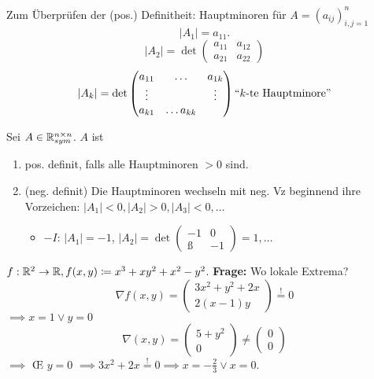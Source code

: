 Zum Überprüfen der (pos.) Definitheit: Hauptminoren für $ A = (a_{ij} )_{i,j = 1}^n  $ 
\[
	\left| A_1 \right| = a_{11}.
\]
\[
	\left| A_2 \right| = \det \begin{pmatrix} a_{11} & a_{12} \\ a_{21} & a_{22} \end{pmatrix} 
\]
\[
	\left| A_k \right| = \det \begin{pmatrix} a_{11} & \hdots & a_{1k} \\ \vdots & & \vdots \\ a_{k1} & \hdots a_{kk}  \end{pmatrix} \text{``$ k $-te Hauptminore''} 
\]

\begin{theorem}[Hirwitz]
	Sei $ A \in \mathbb{R} _{sym} ^{n \times n}  $. $ A $ ist
	\begin{enumerate}[label=(\roman*)]
		\item pos. definit, falls alle Hauptminoren $ > 0 $ sind.
		\item (neg. definit) Die Hauptminoren wechseln mit neg. Vz beginnend ihre Vorzeichen:
			$ \left| A_1 \right| <0, \left| A_2 \right| > 0, \left| A_3 \right| < 0, \dotsc $
			\begin{itemize}
				\item $ -I $: $ \left| A_1 \right|  = -1 $, $ \left| A_2 \right| = \det \begin{pmatrix} -1  & 0 \\ ß & -1 \end{pmatrix} = 1, \dotsc $ 
			\end{itemize}
	\end{enumerate}
\end{theorem}

\begin{example}
	$ f: \mathbb{R} ^2 \to \mathbb{R} , f(x, y) \coloneqq x^3 + xy^2 + x^2 - y^2 $.
	\textbf{Frage:} Wo lokale Extrema?
	\[
		\nabla f(x, y) = \begin{pmatrix} 3x^2 + y^2 + 2x \\ 2(x - 1)y \end{pmatrix} \overset{!}{=} 0
	\]
	$ \implies x = 1 \vee y = 0 $
	\[
		\nabla (x, y) = \begin{pmatrix} 5 + y^2 \\ 0 \end{pmatrix} \neq \begin{pmatrix} 0 \\ 0 \end{pmatrix}
	\]
	$ \implies  $ \OE{} $ y = 0 $ $ \implies 3x^2 + 2x \overset{!}{=} 0 \implies  x = - \frac{ 2 }{ 3 } \vee x = 0 $.
\end{example}

